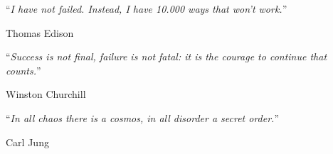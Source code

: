 \vspace*{0.2\textheight}

\noindent\enquote{\itshape I have not failed. Instead, I have 10.000 ways that won't work.}\bigbreak

\hfill Thomas Edison

\noindent\enquote{\itshape Success is not final, failure is not fatal: it is the courage to continue that counts.}\bigbreak

\hfill Winston Churchill

\noindent\enquote{\itshape In all chaos there is a cosmos, in all disorder a secret order.}\bigbreak

\hfill Carl Jung